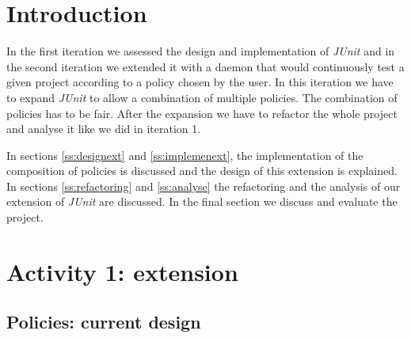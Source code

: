 \documentclass[i3]{oss}
\newcommand{\junit}{\emph{JUnit }}
\begin{document}

\maketitlepage
\newpage
\tableofcontents
\pagebreak



\section*{Introduction}
\label{ssec:introduction}
In the first iteration we assessed the design and implementation of \junit and in the second iteration we extended it with a daemon that would continuously test a given project according to a policy chosen by the user.
In this iteration we have to expand \junit to allow a combination of multiple policies. The combination of policies has to be fair. After the expansion we have to refactor the whole project and analyse it like we did in iteration 1.

In sections \ref{ss:designext} and \ref{ss:implemenext}, the implementation of the composition of policies is discussed and the design of this extension is explained.
In sections \ref{ss:refactoring} and \ref{ss:analyse} the refactoring and the analysis of our extension of \junit are discussed. 
In the final section we discuss and evaluate the project.


\section{Activity 1: extension}

\subsection{Policies: current design}
\label{ss:current-design}
\end{document}
